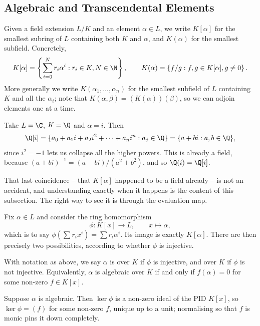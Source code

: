 \subsection{Algebraic and Transcendental Elements}

Given a field extension $L/K$ and an element $\alpha \in L$, we write $K[\alpha]$ for the smallest subring of $L$ containing both $K$ and $\alpha$, and $K(\alpha)$ for the smallest subfield. Concretely,
$$K[\alpha] = \left\{ \sum_{i=0}^N r_i \alpha^i : r_i \in K, N \in \N \right\}, \qquad K(\alpha) = \left\{ f/g : f, g \in K[\alpha], g \neq 0 \right\}.$$
More generally we write $K(\alpha_1, \dots, \alpha_n)$ for the smallest subfield of $L$ containing $K$ and all the $\alpha_i$; note that $K(\alpha, \beta) = (K(\alpha))(\beta)$, so we can adjoin elements one at a time.

\begin{example}
	Take $L = \C$, $K = \Q$ and $\alpha = i$. Then
	$$\Q[i] = \{a_0 + a_1 i + a_2 i^2 + \dots + a_n i^n : a_j \in \Q\} = \{a + bi : a, b \in \Q\},$$
	since $i^2 = -1$ lets us collapse all the higher powers. This is already a field, because $(a+bi)^{-1} = (a - bi)/(a^2+b^2)$, and so $\Q(i) = \Q[i]$.
\end{example}

That last coincidence -- that $K[\alpha]$ happened to be a field already -- is not an accident, and understanding exactly when it happens is the content of this subsection. The right way to see it is through the evaluation map.

Fix $\alpha \in L$ and consider the ring homomorphism
$$\phi : K[x] \to L, \qquad x \mapsto \alpha,$$
which is to say $\phi\left(\sum r_i x^i\right) = \sum r_i \alpha^i$. Its image is exactly $K[\alpha]$. There are then precisely two possibilities, according to whether $\phi$ is injective.

\begin{definition}
	With notation as above, we say $\alpha$ is  over $K$ if $\phi$ is injective, and  over $K$ if $\phi$ is not injective. Equivalently, $\alpha$ is algebraic over $K$ if and only if $f(\alpha) = 0$ for some non-zero $f \in K[x]$.
\end{definition}

Suppose $\alpha$ is algebraic. Then $\ker \phi$ is a non-zero ideal of the PID $K[x]$, so $\ker \phi = (f)$ for some non-zero $f$, unique up to a unit; normalising so that $f$ is monic pins it down completely.

